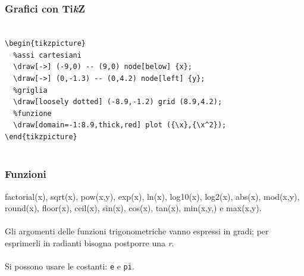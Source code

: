 \documentclass[aspectratio=169,compress]{beamer}
\newcommand{\1}{\ensuremath{\mathds{1}}}
\newcommand{\Tikz}{Ti\emph{k}Z}
\begin{document}
\begin{frame}\centering
  \frametitle{Grafici con \Tikz}
  \begin{flushleft}
    \texttt{~\\
    \textbackslash{}begin\{tikzpicture\}\\
    ~~\%assi cartesiani\\
    ~~\textbackslash{}draw[-\textgreater{}] (-9,0) -\hspace{0.01mm}- (9,0) node[below] \{\textdollar{}x\textdollar{}\};
\\
    ~~\textbackslash{}draw[-\textgreater{}] (0,-1.3) -\hspace{0.01mm}- (0,4.2) node[left] \{\textdollar{}y\textdollar{}\};\\
    ~~\%griglia\\
    ~~\textbackslash{}draw[loosely dotted] (-8.9,-1.2) grid (8.9,4.2);\\
    ~~\%funzione
\\
    ~~\textbackslash{}draw[domain=-1:8.9,thick,red] plot (\{\textbackslash{}x\},\{\textbackslash{}x\^{}2\});
\\
    \textbackslash{}end\{tikzpicture\}\\~
    }
    \end{flushleft}
\end{frame}
\begin{frame}\centering
  \frametitle{Funzioni}
 factorial(x), sqrt(x), pow(x,y), exp(x), ln(x), log10(x), log2(x), abs(x), mod(x,y), round(x), floor(x), ceil(x), sin(x), cos(x), tan(x), min(x,y,) e max(x,y).\\~\\\pause
 Gli argomenti delle funzioni trigonometriche vanno espressi in gradi; per esprimerli in radianti bisogna postporre una \emph{r}.\\~\\\pause
 Si possono usare le costanti: \texttt{e} e \texttt{pi}. 
\end{frame}
\end{document}
